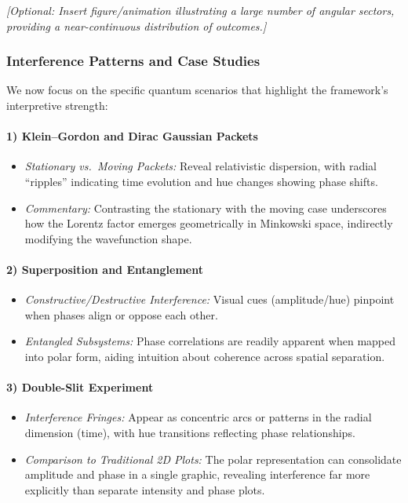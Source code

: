 \noindent
\textit{[Optional: Insert figure/animation illustrating a large number of angular sectors, providing a near-continuous distribution of outcomes.]}


\subsubsection{Interference Patterns and Case Studies}
We now focus on the specific quantum scenarios that highlight the framework’s interpretive strength:

\paragraph{1) Klein--Gordon and Dirac Gaussian Packets}
\begin{itemize}
    \item \textit{Stationary vs.\ Moving Packets:} Reveal relativistic dispersion, with radial “ripples” indicating time evolution and hue changes showing phase shifts.
    \item \textit{Commentary:} Contrasting the stationary with the moving case underscores how the Lorentz factor emerges geometrically in Minkowski space, indirectly modifying the wavefunction shape.
\end{itemize}

\paragraph{2) Superposition and Entanglement}
\begin{itemize}
    \item \textit{Constructive/Destructive Interference:} Visual cues (amplitude/hue) pinpoint when phases align or oppose each other.
    \item \textit{Entangled Subsystems:} Phase correlations are readily apparent when mapped into polar form, aiding intuition about coherence across spatial separation.
\end{itemize}

\paragraph{3) Double-Slit Experiment}
\begin{itemize}
    \item \textit{Interference Fringes:} Appear as concentric arcs or patterns in the radial dimension (time), with hue transitions reflecting phase relationships.
    \item \textit{Comparison to Traditional 2D Plots:} The polar representation can consolidate amplitude and phase in a single graphic, revealing interference far more explicitly than separate intensity and phase plots.
\end{itemize}

